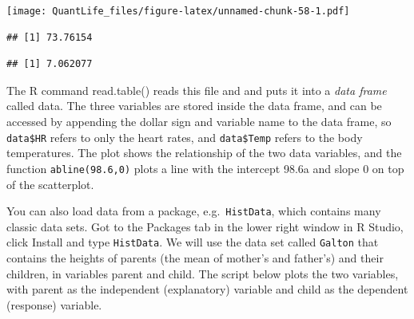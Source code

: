 \documentclass[
]{book}
\newenvironment{Shaded}{\begin{snugshade}}{\end{snugshade}}
\newcommand{\DataTypeTok}[1]{\textcolor[rgb]{0.13,0.29,0.53}{#1}}
\newcommand{\KeywordTok}[1]{\textcolor[rgb]{0.13,0.29,0.53}{\textbf{#1}}}
\newcommand{\NormalTok}[1]{#1}
\newcommand{\OperatorTok}[1]{\textcolor[rgb]{0.81,0.36,0.00}{\textbf{#1}}}
\newcommand{\StringTok}[1]{\textcolor[rgb]{0.31,0.60,0.02}{#1}}
\theoremstyle{definition}
\theoremstyle{definition}
\theoremstyle{definition}
\theoremstyle{remark}
\begin{document}
\texttt{[image: QuantLife\_files/figure-latex/unnamed-chunk-58-1.pdf]}

\begin{Shaded}
\end{Shaded}

\begin{verbatim}
## [1] 73.76154
\end{verbatim}

\begin{Shaded}
\end{Shaded}

\begin{verbatim}
## [1] 7.062077
\end{verbatim}

The R command read.table() reads this file and and puts it into a \emph{data frame} called data. The three variables are stored inside the data frame, and can be accessed by appending the dollar sign and variable name to the data frame, so \texttt{data\$HR} refers to only the heart rates, and \texttt{data\$Temp} refers to the body temperatures. The plot shows the relationship of the two data variables, and the function \texttt{abline(98.6,0)} plots a line with the intercept 98.6a and slope 0 on top of the scatterplot.

You can also load data from a package, e.g.~\texttt{HistData}, which contains many classic data sets. Got to the Packages tab in the lower right window in R Studio, click Install and type \texttt{HistData}. We will use the data set called \texttt{Galton} that contains the heights of parents (the mean of mother's and father's) and their children, in variables parent and child. The script below plots the two variables, with parent as the independent (explanatory) variable and child as the dependent (response) variable.

\begin{Shaded}
\end{Shaded}
\end{document}
